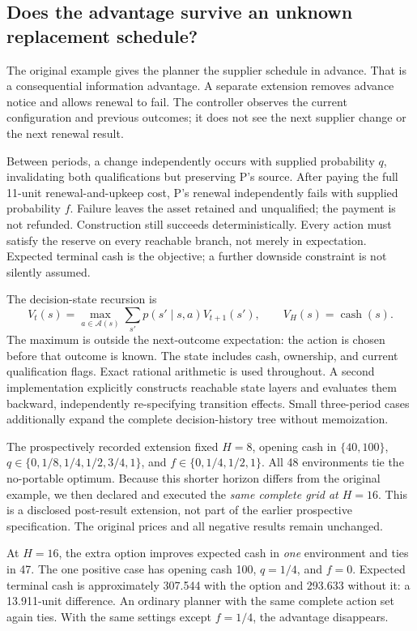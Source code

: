 \subsection{Does the advantage survive an unknown replacement schedule?}
\label{sec:uncertainty}
The original example gives the planner the supplier schedule in advance. That is a consequential information advantage. A separate extension removes advance notice and allows renewal to fail. The controller observes the current configuration and previous outcomes; it does not see the next supplier change or the next renewal result.

Between periods, a change independently occurs with supplied probability $q$, invalidating both qualifications but preserving P's source. After paying the full 11-unit renewal-and-upkeep cost, P's renewal independently fails with supplied probability $f$. Failure leaves the asset retained and unqualified; the payment is not refunded. Construction still succeeds deterministically. Every action must satisfy the reserve on every reachable branch, not merely in expectation. Expected terminal cash is the objective; a further downside constraint is not silently assumed.

The decision-state recursion is
\begin{equation}
 V_t(s)=\max_{a\in\mathcal A(s)}\sum_{s'}p(s'\mid s,a)V_{t+1}(s'),
 \qquad V_H(s)=\operatorname{cash}(s).
 \label{eq:nonanticipating}
\end{equation}
The maximum is outside the next-outcome expectation: the action is chosen before that outcome is known. The state includes cash, ownership, and current qualification flags. Exact rational arithmetic is used throughout. A second implementation explicitly constructs reachable state layers and evaluates them backward, independently re-specifying transition effects. Small three-period cases additionally expand the complete decision-history tree without memoization.

The prospectively recorded extension fixed $H=8$, opening cash in $\{40,100\}$, $q\in\{0,1/8,1/4,1/2,3/4,1\}$, and $f\in\{0,1/4,1/2,1\}$. All 48 environments tie the no-portable optimum. Because this shorter horizon differs from the original example, we then declared and executed the \emph{same complete grid at $H=16$}. This is a disclosed post-result extension, not part of the earlier prospective specification. The original prices and all negative results remain unchanged.

At $H=16$, the extra option improves expected cash in \emph{one} environment and ties in 47. The one positive case has opening cash 100, $q=1/4$, and $f=0$. Expected terminal cash is approximately 307.544 with the option and 293.633 without it: a 13.911-unit difference. An ordinary planner with the same complete action set again ties. With the same settings except $f=1/4$, the advantage disappears.

